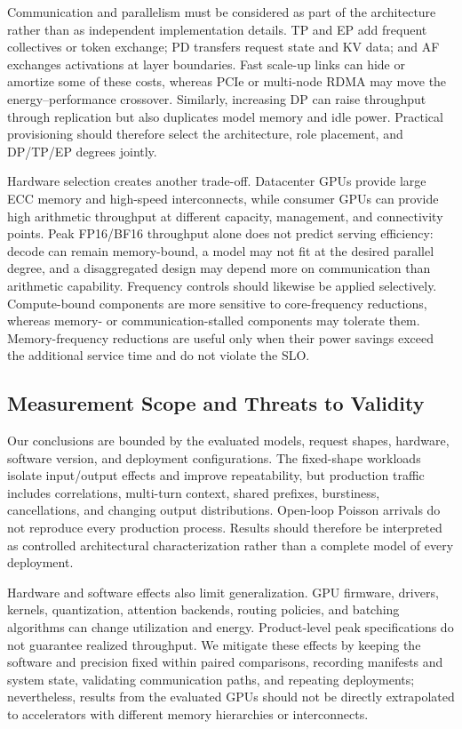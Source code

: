 Communication and parallelism must be considered as part of the architecture rather than as independent implementation details. TP and EP add frequent collectives or token exchange; PD transfers request state and KV data; and AF exchanges activations at layer boundaries. Fast scale-up links can hide or amortize some of these costs, whereas PCIe or multi-node RDMA may move the energy--performance crossover. Similarly, increasing DP can raise throughput through replication but also duplicates model memory and idle power. Practical provisioning should therefore select the architecture, role placement, and DP/TP/EP degrees jointly.

Hardware selection creates another trade-off. Datacenter GPUs provide large ECC memory and high-speed interconnects, while consumer GPUs can provide high arithmetic throughput at different capacity, management, and connectivity points. Peak FP16/BF16 throughput alone does not predict serving efficiency: decode can remain memory-bound, a model may not fit at the desired parallel degree, and a disaggregated design may depend more on communication than arithmetic capability. Frequency controls should likewise be applied selectively. Compute-bound components are more sensitive to core-frequency reductions, whereas memory- or communication-stalled components may tolerate them. Memory-frequency reductions are useful only when their power savings exceed the additional service time and do not violate the SLO.

\subsection{Measurement Scope and Threats to Validity}
\label{sec:discussion-validity}

Our conclusions are bounded by the evaluated models, request shapes, hardware, software version, and deployment configurations. The fixed-shape workloads isolate input/output effects and improve repeatability, but production traffic includes correlations, multi-turn context, shared prefixes, burstiness, cancellations, and changing output distributions. Open-loop Poisson arrivals do not reproduce every production process. Results should therefore be interpreted as controlled architectural characterization rather than a complete model of every deployment.

Hardware and software effects also limit generalization. GPU firmware, drivers, kernels, quantization, attention backends, routing policies, and batching algorithms can change utilization and energy. Product-level peak specifications do not guarantee realized throughput. We mitigate these effects by keeping the software and precision fixed within paired comparisons, recording manifests and system state, validating communication paths, and repeating deployments; nevertheless, results from the evaluated GPUs should not be directly extrapolated to accelerators with different memory hierarchies or interconnects.

